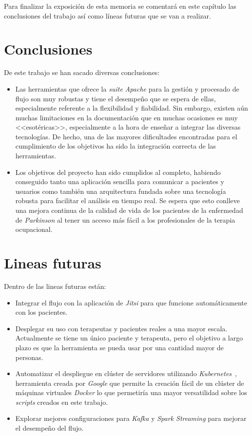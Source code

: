 
Para finalizar la exposición de esta memoria se comentará en este capítulo las conclusiones del 
trabajo así como líneas futuras que se van a realizar.

\section{Conclusiones}

De este trabajo se han sacado diversas conclusiones:

\begin{itemize}
	\item Las herramientas que ofrece la \textit{suite} \textit{Apache} para la gestión y procesado de flujo son muy robustas y tiene el desempeño que se espera de ellas, especialmente referente a la flexibilidad y fiabilidad. Sin embargo, existen aún muchas limitaciones en la documentación que en muchas ocasiones es muy <<esotéricas>>, especialmente a la hora de enseñar a integrar las diversas tecnologías. De hecho, una de las mayores dificultades encontradas para el cumplimiento de los objetivos ha sido la integración correcta de las herramientas.
	\item Los objetivos del proyecto han sido cumplidos al completo, habiendo conseguido tanto una aplicación sencilla para comunicar a pacientes y usuarios como también una arquitectura fundada sobre una tecnología robusta para facilitar el análisis en tiempo real. Se espera que esto conlleve una mejora continua de la calidad de vida de los pacientes de la enfermedad de \textit{Parkinson} al tener un acceso más fácil a los profesionales de la terapia ocupacional.
\end{itemize}

\section{Lineas futuras}

Dentro de las lineas futuras están:

\begin{itemize}
	\item Integrar el flujo con la aplicación de \textit{Jitsi} para que funcione automáticamente con los pacientes.
	\item Desplegar su uso con terapeutas y pacientes reales a una mayor escala. Actualmente se tiene un único paciente y terapeuta, pero el objetivo a largo plazo es que la herramienta se pueda usar por una cantidad mayor de personas.
	\item Automatizar el despliegue en clúster de servidores utilizando \textit{Kubernetes}~\cite{losautoresdekubernetes2020}, herramienta creada por \textit{Google} que permite la creación fácil de un clúster de máquinas virtuales \textit{Docker} lo que permetiría una mayor versatilidad sobre los \textit{scripts} creados en este trabajo.
	\item Explorar mejores configuraciones para \textit{Kafka} y \textit{Spark Streaming} para mejorar el desempeño del flujo.
\end{itemize}